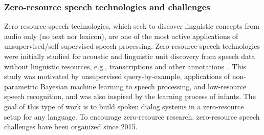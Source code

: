 \subsubsection{Zero-resource speech technologies and challenges}
\label{zero_speech}
Zero-resource speech technologies, which seek to discover linguistic concepts
from audio only (no text nor lexicon), are one of the most active applications
of unsupervised/self-supervised speech processing.
Zero-resource speech technologies were initially studied for acoustic and
linguistic unit discovery from speech data without linguistic resources,
e.g., transcriptions and other annotations~\cite{jansen2013summary}.
This study was motivated by unsupervised query-by-example, applications of
non-parametric Bayesian machine learning to speech processing, and low-resource
speech recognition, and was also inspired by the learning process of infants.
The goal of this type of work is to build spoken dialog systems in a zero-resource
setup for any language.
  To encourage      zero-resource research,                  %
zero-resource speech challenges have been organized since 2015.

